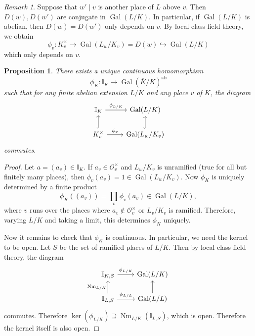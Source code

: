 \documentclass[leqno, openany]{memoir}
\newtheorem{prop}[thm]{Proposition}
\theoremstyle{definition}
\theoremstyle{remark}
\newtheorem{rmk}[thm]{Remark}
\theoremstyle{plain}
\theoremstyle{definition}
\theoremstyle{remark}
\newcommand{\I}{\mathbb{I}}
\newcommand{\mc}[1]{\mathcal{#1}}
\newcommand{\mr}[1]{\mathrm{#1}}
\newcommand{\ol}[1]{\overline{#1}}
\DeclareMathOperator{\Gal}{Gal}
\DeclareMathOperator{\Nm}{Nm}
\begin{document}
\begin{rmk}
    Suppose that $w' \mid v$ is another place of $L$ above $v$. Then $D(w), D(w')$ are conjugate in $\Gal(L/K)$. In particular, if $\Gal(L/K)$ is abelian, then $D(w) = D(w')$ only depends on $v$. By local class field theory, we obtain 
    \[ \phi_v \colon K_v^{\times} \to \Gal(L_w/K_v) = D(w) \hookrightarrow \Gal(L/K) \]
    which only depends on $v$.
\end{rmk}

\begin{prop}
    There exists a unique continuous homomorphism
    \[ \phi_K \colon \I_K \to {\Gal(\ol{K}/K)}^{\mr{ab}} \]
    such that for any finite abelian extension $L/K$ and any place $v$ of $K$, the diagram
    \begin{equation*}
    \begin{tikzcd}
        \I_K \ar{r}{\phi_{L/K}} & \Gal(L/K) \\
        K_v^{\times} \ar{r}{\phi_v} \ar[hookrightarrow]{u} & \Gal(L_w/K_v) \ar[hookrightarrow]{u}
    \end{tikzcd}
    \end{equation*}
    commutes.
\end{prop}

\begin{proof}
    Let $a = (a_v) \in \I_K$. If $a_v \in \mc{O}_v^{\times}$ and $L_w/K_v$ is unramified (true for all but finitely many places), then $\phi_v(a_v) = 1 \in \Gal(L_w/K_v)$. Now $\phi_K$ is uniquely determined by a finite product
    \[ \phi_K((a_v)) = \prod_v \phi_v(a_v) \in \Gal(L/K), \]
    where $v$ runs over the places where $a_v \notin \mc{O}_v^{\times}$ or $L_v/K_v$ is ramified. Therefore, varying $L/K$ and taking a limit, this determines $\phi_K$ uniquely. 

    Now it remains to check that $\phi_K$ is continuous. In particular, we need the kernel to be open. Let $S$ be the set of ramified places of $L/K$. Then by local class field theory, the diagram
    \begin{equation*}
    \begin{tikzcd}
        \I_{K,S} \ar{r}{\phi_{L/K}} & \Gal(L/K) \\
        \I_{L,S} \ar{u}{\Nm_{L/K}} \ar{r}{\phi_{L/L}} & \Gal(L/L) \ar{u}
    \end{tikzcd}
    \end{equation*}
    commutes. Therefore $\ker(\phi_{L/K}) \supseteq \Nm_{L/K} (\I_{L,S})$, which is open. Therefore the kernel itself is also open.
\end{proof}
\end{document}

